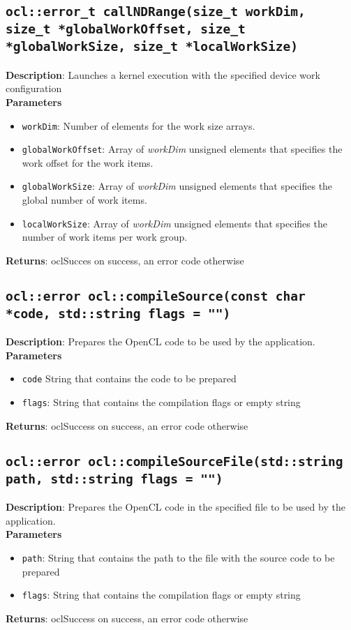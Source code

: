 \subsection{\texttt{ocl::error\_t callNDRange(size\_t workDim, size\_t *globalWorkOffset, size\_t 
*globalWorkSize, size\_t *localWorkSize)}}

\textbf{Description}: Launches a kernel execution with the specified device work configuration\\
\textbf{Parameters}
\begin{itemize}
  \item \texttt{workDim}: Number of elements for the work size arrays.
  \item \texttt{globalWorkOffset}: Array of \emph{workDim} unsigned elements that specifies the work 
  offset for the work items.
  \item \texttt{globalWorkSize}: Array of \emph{workDim} unsigned elements that specifies the global 
  number of work items.
  \item \texttt{localWorkSize}: Array of \emph{workDim} unsigned elements that specifies the number 
  of work items per work group.
\end{itemize}
\textbf{Returns}: oclSucces on success, an error code otherwise


\subsection{\texttt{ocl::error ocl::compileSource(const char *code, std::string flags = "")}}

\textbf{Description}: Prepares the OpenCL code to be used by the application. \\
\textbf{Parameters}
\begin{itemize}
  \item \texttt{code} String that contains the code to be prepared
  \item \texttt{flags}: String that contains the compilation flags or empty string
\end{itemize}
\textbf{Returns}: oclSuccess on success, an error code otherwise

\subsection{\texttt{ocl::error ocl::compileSourceFile(std::string path, std::string flags = "")}}

\textbf{Description}: Prepares the OpenCL code in the specified file to be used by the application.  \\
\textbf{Parameters}
\begin{itemize}
  \item \texttt{path}: String that contains the path to the file with the source code to be prepared
  \item \texttt{flags}: String that contains the compilation flags or empty string
\end{itemize}
\textbf{Returns}: oclSuccess on success, an error code otherwise

